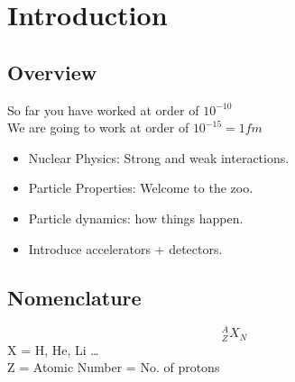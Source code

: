 \chapter{Introduction}
\section{Overview}
So far you have worked at order of \(10^{-10}\) \\
We are going to work at order of \(10^{-15} = 1fm\) 
\begin{itemize}
    \item Nuclear Physics: Strong and weak interactions. 
    \item Particle Properties: Welcome to the zoo. 
    \item Particle dynamics: how things happen.
    \item Introduce accelerators + detectors.
\end{itemize}
\section{Nomenclature}
\[
    {^{A}_Z X_N}
\]
X = H, He, Li \dots\\
Z = Atomic Number = No. of protons\\



